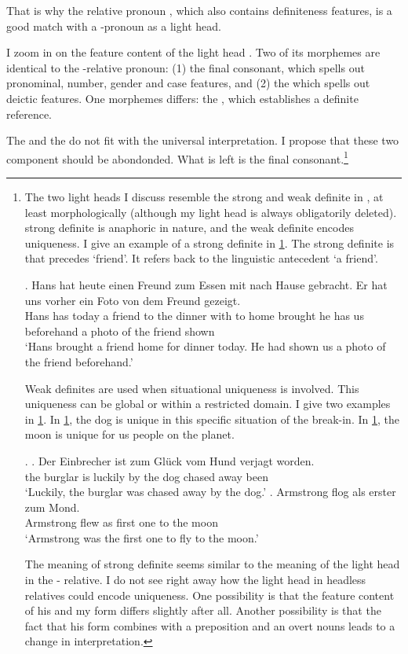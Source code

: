 That is why the relative pronoun , which also contains definiteness features, is a good match with a -pronoun as a light head.

I zoom in on the feature content of the light head . Two of its morphemes are identical to the -relative pronoun: (1) the final consonant, which spells out pronominal, number, gender and case features, and (2) the  which spells out deictic features. One morphemes differs: the , which establishes a definite reference.

The  and the  do not fit with the universal interpretation. I propose that these two component should be abondonded. What is left is the final consonant.\footnote{
The two light heads I discuss resemble the strong and weak definite in \citet{schwarz2009}, at least morphologically (although my light head is always obligatorily deleted).  strong definite is anaphoric in nature, and the weak definite encodes uniqueness. I give an example of a strong definite in \ref{ex:mg-florian-strong}. The strong definite is  that precedes  `friend'. It refers back to the linguistic antecedent  `a friend'.

\exg. Hans hat heute einen Freund zum Essen mit nach Hause gebracht. Er hat uns vorher ein Foto von dem Freund gezeigt.\\
Hans has today a friend {to the} dinner with to home brought he has us beforehand a photo of the friend shown\\
`Hans brought a friend home for dinner today. He had shown us a photo of the friend beforehand.'\label{ex:mg-florian-strong}

Weak definites are used when situational uniqueness is involved. This uniqueness can be global or within a restricted domain. I give two examples in \ref{ex:mg-florian-weak}. In \ref{ex:mg-florian-weak-hund}, the dog is unique in this specific situation of the break-in. In \ref{ex:mg-florian-weak-mond}, the moon is unique for us people on the planet.

\ex.\label{ex:mg-florian-weak}
\ag. Der Einbrecher ist {zum Glück} vom Hund verjagt worden.\\
the burglar is luckily {by the} dog {chased away} been\\
`Luckily, the burglar was chased away by the dog.'\label{ex:mg-florian-weak-hund}
\bg. Armstrong flog als erster zum Mond.\\
Armstrong flew as {first one} {to the} moon\\
`Armstrong was the first one to fly to the moon.' \label{ex:mg-florian-weak-mond}

The meaning of  strong definite seems similar to the meaning of the light head in the - relative.
I do not see right away how the light head in headless relatives could encode uniqueness. One possibility is that the feature content of his and my form differs slightly after all. Another possibility is that the fact that his form combines with a preposition and an overt nouns leads to a change in interpretation.
}

